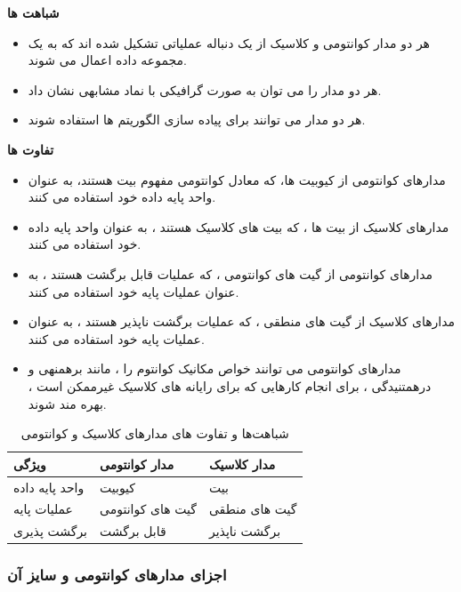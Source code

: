 \documentclass{book}
\begin{document}
\textbf{شباهت ها}

\begin{itemize}
	\item هر دو مدار کوانتومی و کلاسیک از یک دنباله عملیاتی تشکیل شده اند که به یک مجموعه داده اعمال می شوند.
	\item هر دو مدار را می توان به صورت گرافیکی با نماد مشابهی نشان داد.
	\item هر دو مدار می توانند برای پیاده سازی الگوریتم ها استفاده شوند.
\end{itemize}

\textbf{تفاوت ها}

\begin{itemize}
	\item مدارهای کوانتومی از کیوبیت ها، که معادل کوانتومی مفهوم بیت هستند، به عنوان واحد پایه داده خود استفاده می کنند. 
	\item مدارهای کلاسیک از بیت ها ، که بیت های کلاسیک هستند ، به عنوان واحد پایه داده خود استفاده می کنند.
	\item مدارهای کوانتومی از گیت های کوانتومی ، که عملیات قابل برگشت هستند ، به عنوان عملیات پایه خود استفاده می کنند.
	\item  مدارهای کلاسیک از گیت های منطقی ، که عملیات برگشت ناپذیر هستند ، به عنوان عملیات پایه خود استفاده می کنند.
	\item مدارهای کوانتومی می توانند خواص مکانیک کوانتوم را ، مانند برهمنهی و درهمتنیدگی ، برای انجام کارهایی که برای رایانه های کلاسیک غیرممکن است ، بهره مند شوند.
\end{itemize}


\renewcommand{\arraystretch}{1.5}
\begin{table}[ht]
	\centering
	\begin{tabular}[5pt]{|p{100pt}|p{100pt}|p{100pt}|}
		\hline
		\textbf{ویژگی} & \textbf{مدار کوانتومی} &\textbf{مدار کلاسیک} \\
		\hline
		واحد پایه داده & کیوبیت & بیت \\
		\hline
	      عملیات پایه & گیت های کوانتومی & گیت های منطقی \\
		\hline
		برگشت پذیری & قابل برگشت & برگشت ناپذیر \\
		\hline
	\end{tabular}
	\caption{شباهت‌ها و تفاوت های مدارهای کلاسیک و کوانتومی}
\end{table}



\subsubsection{اجزای مدار‌های کوانتومی و سایز آن }
\end{document}
